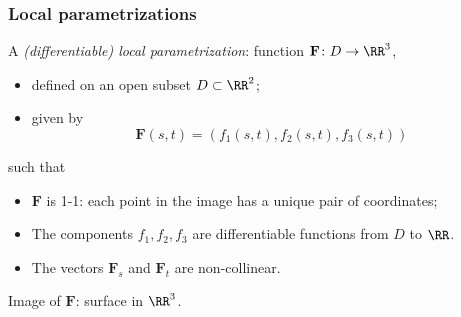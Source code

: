 \begin{frame}
  \frametitle{Local parametrizations}

  A \emph{(differentiable) local parametrization}:
   function $\textbf{F} \colon D \to \RR^3$,
   \begin{itemize}
     \item defined on an open subset $D \subset \RR^2$;
     \item given by
%
$$\textbf{F}(s,t) = ( f_1(s,t), f_2(s,t), f_3(s,t) )$$
   \end{itemize}
%
such that
%
\begin{itemize}
  \item $\textbf{F}$ is 1-1: each point in the image has a unique pair of coordinates;
  \item The components $f_1, f_2, f_3$ are differentiable functions from $D$ to $\RR$.
  \item The vectors $\textbf{F}_s$ and $\textbf{F}_t$ are non-collinear.
\end{itemize}

\medskip

Image of $\textbf{F}$: surface in $\RR^3$.
\end{frame}